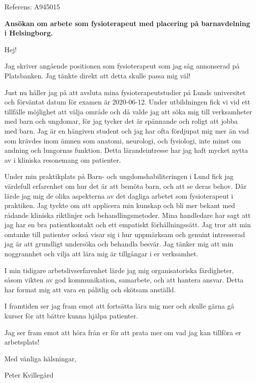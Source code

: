 \documentclass[10pt,a4paper]{letter}
\begin{document}
 
	\begin{letter}{Referens: A945015} 
		
\opening{\textbf{Ansökan om arbete som fysioterapeut med placering på barnavdelning i Helsingborg.}}
Hej!

Jag skriver angående positionen som fysioterapeut som jag såg annonserad på Platsbanken. Jag tänkte direkt att detta skulle passa mig väl!

Just nu håller jag på att avsluta mina fysioterapeutstudier på Lunds universitet och förväntat \mbox{datum} för examen är 2020-06-12. Under utbildningen fick vi vid ett tillfälle möjlighet att välja område och då valde jag att söka mig till verksamheter med barn och ungdomar, för jag tycker det är spännande och roligt att jobba med barn. Jag är en hängiven student och jag har ofta fördjupat mig mer än vad som krävdes inom ämnen som anatomi, neurologi, och fysiologi, inte minst om andning och lungornas funktion. Detta lärande\-intresse har jag haft mycket nytta av i kliniska resonemang om patienter.

Under min praktikplats på Barn- och ungdomshabiliteringen i Lund fick jag värdefull erfarenhet om hur det är att bemöta barn, och att se deras behov. Där lärde jag mig de olika aspekterna av det dagliga arbetet som fysioterapeut i praktiken. Jag tyckte om att applicera min kunskap och bli mer bekant med rådande kliniska riktlinjer och behandlingsmetoder. Mina handledare har sagt att jag har en bra patientkontakt och ett empatiskt förhållningssätt. Jag tror att min omtanke till patienter också visar sig i hur uppmärksam och genuint intresserad jag är att grundligt undersöka och behandla besvär. Jag tänker mig att min noggrannhet och vilja att lära mig är tillgångar i er verksamhet.

I min tidigare arbetslivserfarenhet lärde jag mig organisatoriska färdigheter, såsom vikten av god kommunikation, samarbete, och att hantera ansvar. Detta har format mig att vara en pålitlig och skötsam anställd.

I framtiden ser jag fram emot att fortsätta lära mig mer och skulle gärna gå kurser för att bättre kunna hjälpa patienter.

Jag ser fram emot att höra från er för att prata mer om vad jag kan tillföra er arbetsplats!
	
\vspace{1em}
\hspace{0.1\linewidth}Med vänliga hälsningar,

\hspace{0.1\linewidth}Peter Kvillegård
		 
 
\end{letter} 
\end{document}
